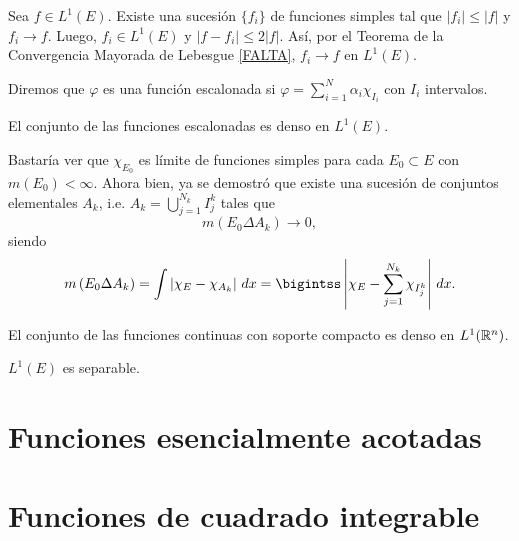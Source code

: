 \begin{demo}
Sea $f\in L^1(E)$. Existe una sucesi\'on $\{f_i\}$ de funciones simples tal que $|f_i|\leq |f|$ y $f_i \to f$. Luego, $f_i \in L^1(E)$ y $|f-f_i|\leq 2|f|$. As\'i, por el Teorema de la Convergencia Mayorada de Lebesgue \ref{FALTA}, $f_i \to f$ en $L^1(E)$.
\end{demo}

\begin{definicion}{}
Diremos que $\varphi$ es una funci\'on escalonada si 
$\varphi=\sum\limits_{i=1}^N \alpha_i \chi_{I_i}$
con $I_i$ intervalos.
\end{definicion}

\begin{teorema}{}
El conjunto de las funciones escalonadas es denso en $L^1(E)$.
\end{teorema}

\begin{demo}
Bastar\'ia ver que $\chi_{E_0}$ es l\'imite de funciones simples para cada $E_0\subset E$ con $m(E_0)<\infty$.
Ahora bien, ya se demostr\'o que existe una sucesi\'on  de conjuntos elementales $A_k$, i.e. $A_k=\bigcup\limits_{j=1}^{N_k} I_j^k$ tales que 
\[
m\left(E_0\Delta A_k\right) \to 0,
\]
siendo
\[
m\left(E_0\Delta A_k\right)=
\int \left|\chi_E-\chi_{A_k}\right|\,dx=
\bigintss \left|
\chi_E-\sum\limits_{j=1}^{N_k} \chi_{I_j^k}
\right|\,dx.
\]
\end{demo}

\begin{ejercicio}{}
El conjunto de las funciones continuas con soporte compacto es denso en $L^1(\mathbb{R}^n)$.
\end{ejercicio}

\begin{ejercicio}{}
$L^1(E)$ es separable.
\end{ejercicio}

\section{Funciones esencialmente acotadas}


\section{Funciones de cuadrado integrable}